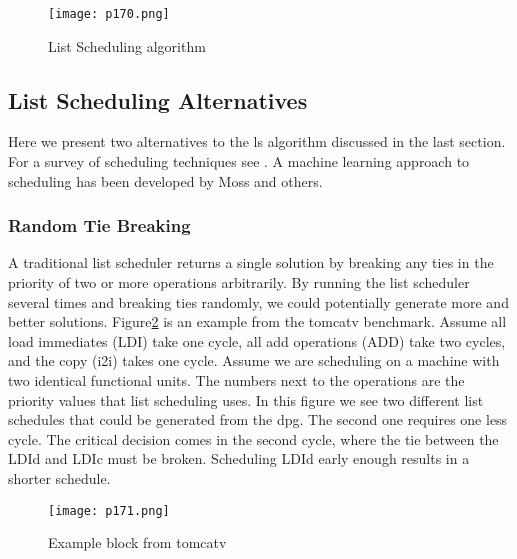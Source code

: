 \begin{figure}[H]
	\centering
	\texttt{[image: p170.png]}
	\caption{List Scheduling algorithm}
	\label{fig:p170}
\end{figure}


\subsection{List Scheduling Alternatives}

Here we present two alternatives to the ls algorithm discussed in the last section. For a survey of scheduling
techniques see . A machine learning approach to scheduling has been developed by Moss and others.



\subsubsection{Random Tie Breaking}

A traditional list scheduler returns a single solution by breaking any ties in the priority of two or more
operations arbitrarily. By running the list scheduler several times and breaking ties randomly, we could
potentially generate more and better solutions. Figure\ref{fig:p171} is an example from the tomcatv benchmark. Assume
all load immediates (LDI) take one cycle, all add operations (ADD) take two cycles, and the copy (i2i) takes
one cycle. Assume we are scheduling on a machine with two identical functional units. The numbers next
to the operations are the priority values that list scheduling uses. In this figure we see two different list
schedules that could be generated from the dpg. The second one requires one less cycle. The critical decision
comes in the second cycle, where the tie between the LDId and LDIc must be broken. Scheduling LDId early
enough results in a shorter schedule.

\begin{figure}[H]
	\centering
	\texttt{[image: p171.png]}
	\caption{Example block from tomcatv}
	\label{fig:p171}
\end{figure}

